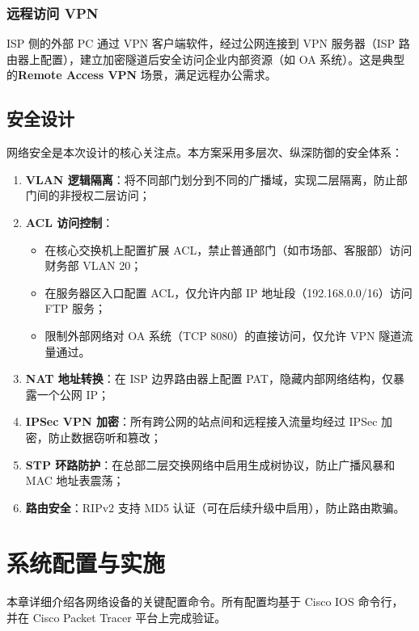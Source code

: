 \documentclass[12pt,a4paper]{ctexart}
\begin{document}
\subsubsection{远程访问 VPN}

ISP 侧的外部 PC 通过 VPN 客户端软件，经过公网连接到 VPN 服务器（ISP 路由器上配置），建立加密隧道后安全访问企业内部资源（如 OA 系统）。这是典型的\textbf{Remote Access VPN} 场景，满足远程办公需求。


\subsection{安全设计}

网络安全是本次设计的核心关注点。本方案采用多层次、纵深防御的安全体系：

\begin{enumerate}[label=(\arabic*), leftmargin=2em]
    \item \textbf{VLAN 逻辑隔离}：将不同部门划分到不同的广播域，实现二层隔离，防止部门间的非授权二层访问；
    \item \textbf{ACL 访问控制}：
        \begin{itemize}
            \item 在核心交换机上配置扩展 ACL，禁止普通部门（如市场部、客服部）访问财务部 VLAN 20；
            \item 在服务器区入口配置 ACL，仅允许内部 IP 地址段（192.168.0.0/16）访问 FTP 服务；
            \item 限制外部网络对 OA 系统（TCP 8080）的直接访问，仅允许 VPN 隧道流量通过。
        \end{itemize}
    \item \textbf{NAT 地址转换}：在 ISP 边界路由器上配置 PAT，隐藏内部网络结构，仅暴露一个公网 IP；
    \item \textbf{IPSec VPN 加密}：所有跨公网的站点间和远程接入流量均经过 IPSec 加密，防止数据窃听和篡改；
    \item \textbf{STP 环路防护}：在总部二层交换网络中启用生成树协议，防止广播风暴和 MAC 地址表震荡；
    \item \textbf{路由安全}：RIPv2 支持 MD5 认证（可在后续升级中启用），防止路由欺骗。
\end{enumerate}

\section{系统配置与实施}

本章详细介绍各网络设备的关键配置命令。所有配置均基于 Cisco IOS 命令行，并在 Cisco Packet Tracer 平台上完成验证。
\end{document}

